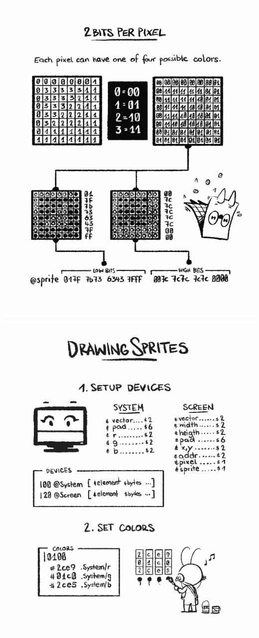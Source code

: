\documentclass[paperheight=4.25in,paperwidth=2.75in,20pt]{article}
\begin{document}
  \includegraphics[width=1.0\paperwidth]{images/10_sprite_encoding_2bpp-680.png}
  \includegraphics[width=1.0\paperwidth]{images/11_drawing_sprites-680.png}
\end{document}
